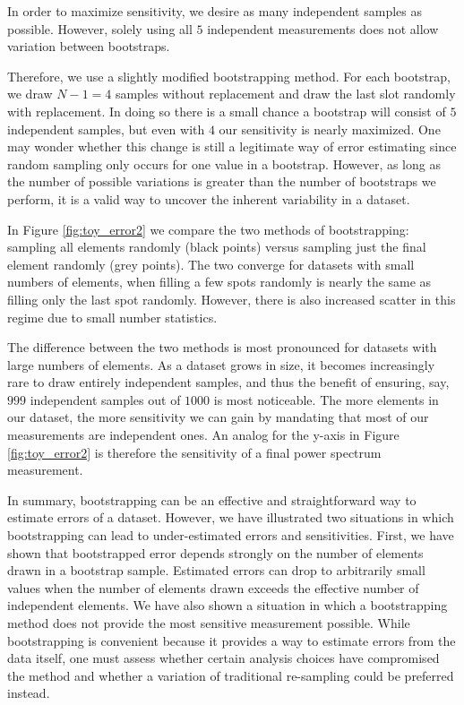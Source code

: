 \documentclass[preprint2,numberedappendix,tighten]{aastex6}  %
\begin{document}
In order to maximize sensitivity, we desire as many independent samples as possible. However, solely using all $5$ independent measurements does not allow variation between bootstraps. 

Therefore, we use a slightly modified bootstrapping method. For each bootstrap, we draw $N-1=4$ samples without replacement and draw the last slot randomly with replacement. In doing so there is a small chance a bootstrap will consist of $5$ independent samples, but even with $4$ our sensitivity is nearly maximized. One may wonder whether this change is still a legitimate way of error estimating since random sampling only occurs for one value in a bootstrap. However, as long as the number of possible variations is greater than the number of bootstraps we perform, it is a valid way to uncover the inherent variability in a dataset. 

In Figure \ref{fig:toy_error2} we compare the two methods of bootstrapping: sampling all elements randomly (black points) versus sampling just the final element randomly (grey points). The two converge for datasets with small numbers of elements, when filling a few spots randomly is nearly the same as filling only the last spot randomly. However, there is also increased scatter in this regime due to small number statistics. 

The difference between the two methods is most pronounced for datasets with large numbers of elements. As a dataset grows in size, it becomes increasingly rare to draw entirely independent samples, and thus the benefit of ensuring, say, $999$ independent samples out of $1000$ is most noticeable. The more elements in our dataset, the more sensitivity we can gain by mandating that most of our measurements are independent ones. An analog for the y-axis in Figure \ref{fig:toy_error2} is therefore the sensitivity of a final power spectrum measurement.

In summary, bootstrapping can be an effective and straightforward way to estimate errors of a dataset. However, we have illustrated two situations in which bootstrapping can lead to under-estimated errors and sensitivities. First, we have shown that bootstrapped error depends strongly on the number of elements drawn in a bootstrap sample. Estimated errors can drop to arbitrarily small values when the number of elements drawn exceeds the effective number of independent elements. We have also shown a situation in which a bootstrapping method does not provide the most sensitive measurement possible. While bootstrapping is convenient because it provides a way to estimate errors from the data itself, one must assess whether certain analysis choices have compromised the method and whether a variation of traditional re-sampling could be preferred instead.
\end{document}
